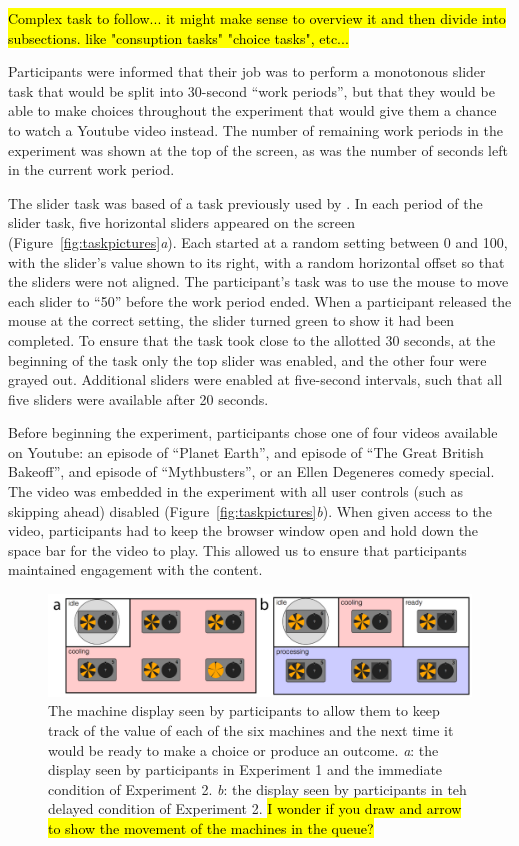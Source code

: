 \documentclass[10pt,letterpaper]{article}
\begin{document}
\hl{Complex task to follow...  it might make sense to overview it and then
divide into subsections.  like "consuption tasks" "choice tasks", etc...}

Participants were informed that their job was to perform a monotonous slider task that
would be split into 30-second ``work periods'', but that they would be able to
make choices throughout the experiment that would give them a chance to watch a
Youtube video instead. The number of remaining work periods in the experiment was shown
at the top of the screen, as was the number of seconds left in the current work period.

The slider task was based of a task previously used by \citet{Gill2012}. In each
period of the slider task, five horizontal sliders appeared on the screen (Figure~\ref{fig:taskpictures}\emph{a}). Each
started at a random setting between 0 and 100, with the slider's value
shown to its right, with a random horizontal offset so that the
sliders were not aligned. The participant's task was to use the mouse to move
each slider to ``50'' before the work period ended. When a participant released
the mouse at the correct setting, the slider turned green to show it had been
completed. To ensure that the task took close to the allotted 30 seconds, at the
beginning of the task only the top slider was enabled, and the other four were
grayed out. Additional sliders were enabled at five-second intervals, such that
all five sliders were available after 20 seconds.

Before beginning the experiment, participants chose one of four videos available
on Youtube: an episode of ``Planet Earth'', and episode of ``The Great British
Bakeoff'', and episode of ``Mythbusters'', or an Ellen Degeneres comedy special.
The video was embedded in the experiment with all user controls (such as
skipping ahead) disabled (Figure~\ref{fig:taskpictures}\emph{b}). When given access to the video, participants had to keep the
browser window open and hold down the space bar for the video to play. This allowed us to ensure that
participants maintained engagement with the content.

\begin{figure}
\centering
\includegraphics[width=\textwidth]{figures/machinemappictures.png}
\caption{The machine display seen by participants to allow them to keep track of
  the value of each of the six machines and the next time it would be ready to
  make a choice or produce an outcome. \emph{a}: the display seen by
  participants in Experiment 1 and the immediate condition of Experiment 2.
  \emph{b}: the display seen by participants in teh delayed condition of
  Experiment 2. \hl{I wonder if you draw and arrow to show the movement of the machines in the queue?}}
\label{fig:machinemappictures}
\end{figure}
\end{document}
